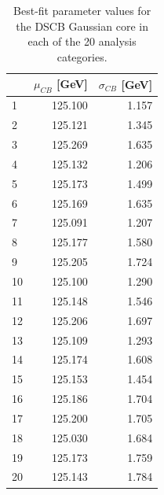 \begin{table}[!htp]
\begin{center}
\begin{tabular}{lrr}
        \hline
        {} & $\mu_{CB}$ [GeV] & $\sigma_{CB}$ [GeV]  \\
        \hline
        1 & 125.100 & 1.157 \\
        2 & 125.121 & 1.345 \\
        3 & 125.269 & 1.635 \\
        4 & 125.132 & 1.206 \\
        5 & 125.173 & 1.499 \\
        6 & 125.169 & 1.635 \\
        7 & 125.091 & 1.207 \\
        8 & 125.177 & 1.580 \\
        9 & 125.205 & 1.724 \\
        10 & 125.100 & 1.290  \\
        11 & 125.148 & 1.546 \\
        12 & 125.206 & 1.697 \\ \hline

        13 & 125.109 & 1.293 \\
        14 & 125.174 & 1.608 \\
        15 & 125.153 & 1.454 \\
        16 & 125.186 & 1.704 \\
        17 & 125.200 & 1.705 \\
        18 & 125.030 & 1.684 \\
        19 & 125.173 & 1.759 \\
        20 & 125.143 & 1.784 \\
        \hline
\end{tabular}
\caption{Best-fit parameter values for the DSCB Gaussian core in each of the 20 analysis categories.}
\label{tab:sig_param1}
\end{center}
\end{table}

